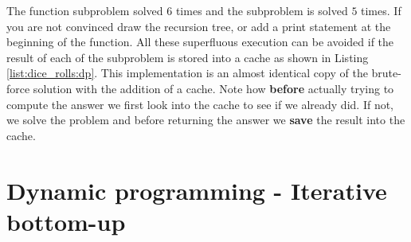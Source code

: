 The function subproblem  solved $6$ times and the subproblem  is solved $5$ times. If you are not convinced draw the recursion tree, or add a print statement at the beginning of the function. All these superfluous execution can be avoided if the result of each of the subproblem is stored into a cache as shown in Listing \ref{list:dice_rolls:dp}. This implementation is an almost identical copy of the brute-force solution with the addition of a cache. Note how \textbf{before} actually trying to compute the answer we first look into the cache to see if we already did. If not, we solve the problem and before returning the answer we \textbf{save} the result into the cache.




\section{Dynamic programming - Iterative bottom-up}
\label{dice_rolls:sec:bottom}

